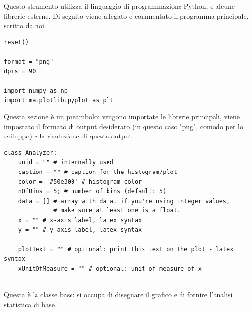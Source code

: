 \documentclass[a4paper,10pt]{report}
\begin{document}
Questo strumento utilizza il linguaggio di programmazione Python, e alcune librerie esterne. Di seguito viene allegato e commentato il programma principale, scritto da noi.

\begin{lstlisting}
reset()

format = "png"
dpis = 90

import numpy as np
import matplotlib.pyplot as plt
\end{lstlisting}

Questa sezione è un preambolo: vengono importate le librerie principali, viene impostato il formato di output desiderato (in questo caso "png", comodo per lo sviluppo) e la risoluzione di questo output.

\begin{lstlisting}
class Analyzer:
    uuid = "" # internally used
    caption = "" # caption for the histogram/plot
    color = '#50e300' # histogram color
    nOfBins = 5; # number of bins (default: 5)
    data = [] # array with data. if you're using integer values,
    		  # make sure at least one is a float.
    x = "" # x-axis label, latex syntax
    y = "" # y-axis label, latex syntax
    
    plotText = "" # optional: print this text on the plot - latex syntax
    xUnitOfMeasure = "" # optional: unit of measure of x
    
\end{lstlisting}

Questa è la classe base: si occupa di disegnare il grafico e di fornire l'analisi statistica di base
\end{document}
